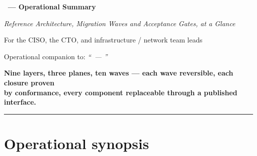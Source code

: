 \documentclass[11pt,a4paper,twoside]{article}
\begin{document}
\begin{center}
\vspace*{-0.2cm}

{\suittitlelogo[0.30\textwidth]}

\smallskip
{\Large\bfseries \suitsolutiontitle\ --- Operational Summary}

\smallskip
{\normalsize\itshape Reference Architecture, Migration Waves and Acceptance Gates,
at a Glance}

\smallskip

\suiteditionline[\normalsize]

\smallskip
{\small For the CISO, the CTO, and infrastructure / network team leads}

\smallskip
{\scriptsize Operational companion to: \emph{``\suitsolutiontitle\ ---
\suitsolutionsubtitle''}}

\smallskip
\suitmetablock

\medskip

\begin{tcolorbox}[
    colback=NavyBlue!8!white, colframe=NavyBlue!85!black,
    boxrule=1.2pt, arc=3pt,
    left=10pt, right=10pt, top=8pt, bottom=8pt, halign=center]
{\normalsize\bfseries Nine layers, three planes, ten waves ---
each wave reversible, each closure proven\\[3pt]
by conformance, every component replaceable through a published interface.}
\end{tcolorbox}
\end{center}

\smallskip
\noindent\rule{\textwidth}{0.6pt}

\section{Operational synopsis}
\end{document}
